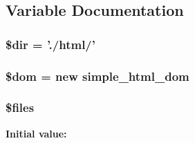 \subsection{Variable Documentation}
\hypertarget{mass__test_8php_a1659f0a629d408e0f849dbe4ee061e62}{
\subsubsection[{\$dir}]{\setlength{\rightskip}{0pt plus 5cm}\$dir = './html/'}}\label{mass__test_8php_a1659f0a629d408e0f849dbe4ee061e62}
\hypertarget{mass__test_8php_a46127a794280dd592812c25b62af34b0}{
\subsubsection[{\$dom}]{\setlength{\rightskip}{0pt plus 5cm}\$dom = new {\bf simple\+\_\+html\+\_\+dom}}}\label{mass__test_8php_a46127a794280dd592812c25b62af34b0}
\hypertarget{mass__test_8php_a9590b15215a21e9b42eb546aeef79704}{
\subsubsection[{\$files}]{\setlength{\rightskip}{0pt plus 5cm}\$files}}\label{mass__test_8php_a9590b15215a21e9b42eb546aeef79704}
{\bfseries Initial value\+:}
